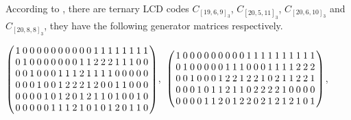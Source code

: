 \documentclass[12pt,twoside]{article}
\theoremstyle{plain}
\theoremstyle{definition}
\theoremstyle{remark}
\begin{document}
According to \cite{ter-11-19}, there are ternary LCD codes $C_{[19,6,9]_3}$, $C_{[20,5,11]_3}$, $C_{[20,6,10]_3}$ and $C_{[20,8,8]_3}$, they have the following generator matrices respectively.
\begin{center}
{\small
$
\begin{pmatrix}
\setlength{\arraycolsep}{1.2pt}
\begin{array}{ccccccccccccccccccc}
 1&0&0&0&0&0&0&0&0&0&0&1&1&1&1&1&1&1&1\\
0&1&0&0&0&0&0&0&0&1&1&2&2&2&1&1&1&0&0\\
0&0&1&0&0&0&1&1&1&2&1&1&1&1&0&0&0&0&0\\
0&0&0&1&0&0&1&2&2&2&1&2&0&0&1&1&0&0&0\\
0&0&0&0&1&0&1&2&0&1&2&1&1&0&1&0&0&1&0\\
0&0&0&0&0&1&1&1&2&1&0&1&0&1&2&0&1&1&0
\end{array}
\end{pmatrix}
$,\
$
\begin{pmatrix}
\setlength{\arraycolsep}{1.2pt}
\begin{array}{cccccccccccccccccccc}
1&0&0&0&0&0&0&0&0&0&1&1&1&1&1&1&1&1&1&1\\
0&1&0&0&0&0&0&1&1&1&0&0&0&1&1&1&1&2&2&2\\
0&0&1&0&0&0&1&2&2&1&2&2&1&0&2&1&1&2&2&1\\
0&0&0&1&0&1&1&2&1&1&0&2&2&2&2&1&0&0&0&0\\
0&0&0&0&1&1&2&0&1&2&2&0&2&1&2&1&2&1&0&1
\end{array}
\end{pmatrix}
$,}
\end{center}
\end{document}
